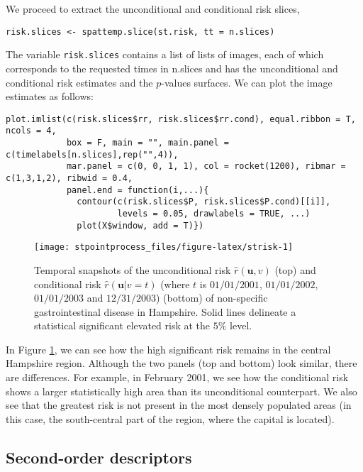 We proceed to extract the unconditional and conditional risk slices,

\begin{verbatim}
risk.slices <- spattemp.slice(st.risk, tt = n.slices)
\end{verbatim}

The variable \texttt{risk.slices} contains a list of lists of images, each of which corresponds to the requested times in n.slices and has the unconditional and conditional risk estimates and the \(p\)-values surfaces. We can plot the image estimates as follows:

\begin{verbatim}
plot.imlist(c(risk.slices$rr, risk.slices$rr.cond), equal.ribbon = T, ncols = 4, 
            box = F, main = "", main.panel = c(timelabels[n.slices],rep("",4)), 
            mar.panel = c(0, 0, 1, 1), col = rocket(1200), ribmar = c(1,3,1,2), ribwid = 0.4,
            panel.end = function(i,...){
              contour(c(risk.slices$P, risk.slices$P.cond)[[i]], 
                      levels = 0.05, drawlabels = TRUE, ...)
              plot(X$window, add = T)})
\end{verbatim}

\begin{figure}

{\centering \texttt{[image: stpointprocess\_files/figure-latex/strisk-1]} 

}

\caption{Temporal snapshots of the unconditional risk $\hat{r}(\mathbf{u},v)$ (top) and conditional risk $\hat{r}(\mathbf{u}|v= t)$ (where $t$ is $01/01/2001$, $01/01/2002$, $01/01/2003$ and $12/31/2003$) (bottom) of non-specific gastrointestinal disease in Hampshire. Solid lines delineate a statistical significant elevated risk at the $5\%$ level.}\label{fig:strisk}
\end{figure}

In Figure \ref{fig:strisk}, we can see how the high significant risk remains in the central Hampshire region. Although the two panels (top and bottom) look similar, there are differences. For example, in February 2001, we see how the conditional risk shows a larger statistically high area than its unconditional counterpart. We also see that the greatest risk is not present in the most densely populated areas (in this case, the south-central part of the region, where the capital is located).

\hypertarget{second-order-descriptors-1}{%
\subsection{Second-order descriptors}\label{second-order-descriptors-1}}

